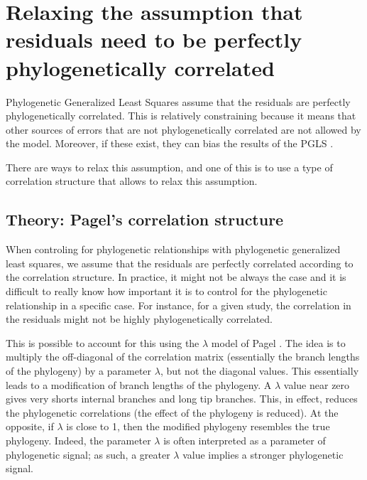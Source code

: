 \documentclass[
]{book}
\begin{document}
\chapter{Relaxing the assumption that residuals need to be perfectly phylogenetically correlated}\label{relaxing-the-assumption-that-residuals-need-to-be-perfectly-phylogenetically-correlated}

Phylogenetic Generalized Least Squares assume that the residuals are perfectly phylogenetically correlated. This is relatively constraining because it means that other sources of errors that are not phylogenetically correlated are not allowed by the model. Moreover, if these exist, they can bias the results of the PGLS \citep{revell2010phylogenetic}.

There are ways to relax this assumption, and one of this is to use a type of correlation structure that allows to relax this assumption.

\section{Theory: Pagel's correlation structure}\label{theory-pagels-correlation-structure}

When controling for phylogenetic relationships with phylogenetic generalized least squares, we assume that the residuals are perfectly correlated according to the correlation structure. In practice, it might not be always the case and it is difficult to really know how important it is to control for the phylogenetic relationship in a specific case. For instance, for a given study, the correlation in the residuals might not be highly phylogenetically correlated.

This is possible to account for this using the \(\lambda\) model of Pagel \citep{pagel1999inferring}. The idea is to multiply the off-diagonal of the correlation matrix (essentially the branch lengths of the phylogeny) by a parameter \(\lambda\), but not the diagonal values. This essentially leads to a modification of branch lengths of the phylogeny. A \(\lambda\) value near zero gives very shorts internal branches and long tip branches. This, in effect, reduces the phylogenetic correlations (the effect of the phylogeny is reduced). At the opposite, if \(\lambda\) is close to 1, then the modified phylogeny resembles the true phylogeny. Indeed, the parameter \(\lambda\) is often interpreted as a parameter of phylogenetic signal; as such, a greater \(\lambda\) value implies a stronger phylogenetic signal.
\end{document}
